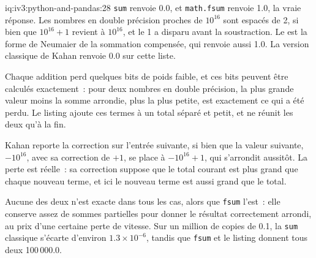 \begin{solution}{iq:iv3:python-and-pandas:28}
\texttt{sum} renvoie 0.0, et \texttt{math.fsum} renvoie 1.0, la vraie réponse. Les nombres en double précision proches de $10^{16}$ sont espacés de 2, si bien que $10^{16} + 1$ revient à $10^{16}$, et le 1 a disparu avant la soustraction. Le  est la forme de Neumaier de la sommation compensée, qui renvoie aussi 1.0. La version classique de Kahan renvoie 0.0 sur cette liste.
\label{lst:iv3:pp:neumaier}

Chaque addition perd quelques bits de poids faible, et ces bits peuvent être calculés exactement~: pour deux nombres en double précision, la plus grande valeur moins la somme arrondie, plus la plus petite, est exactement ce qui a été perdu. Le listing ajoute ces termes à un total séparé et petit, et ne réunit les deux qu'à la fin.

Kahan reporte la correction sur l'entrée suivante, si bien que la valeur suivante, $-10^{16}$, avec sa correction de $+1$, se place à $-10^{16} + 1$, qui s'arrondit aussitôt. La perte est réelle~: sa correction suppose que le total courant est plus grand que chaque nouveau terme, et ici le nouveau terme est aussi grand que le total.

Aucune des deux n'est exacte dans tous les cas, alors que \texttt{fsum} l'est~: elle conserve assez de sommes partielles pour donner le résultat correctement arrondi, au prix d'une certaine perte de vitesse. Sur un million de copies de 0.1, la \texttt{sum} classique s'écarte d'environ $1.3 \times 10^{-6}$, tandis que \texttt{fsum} et le listing donnent tous deux 100\,000.0.

\end{solution}

